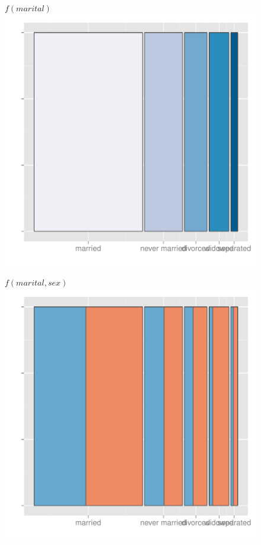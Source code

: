 \documentclass[journal]{vgtc}
\begin{document}
\begin{figure}[htbp]
\begin{minipage}[b]{0.3\linewidth}
  	$f(marital)$
      \includegraphics[width=\linewidth]{part-comb-1}%
\end{minipage} 
\begin{minipage}[b]{0.3\linewidth}
$f(marital, sex)$ 
       \includegraphics[width=\linewidth]{part-comb-2}

\end{minipage}
\end{figure}
\end{document}
